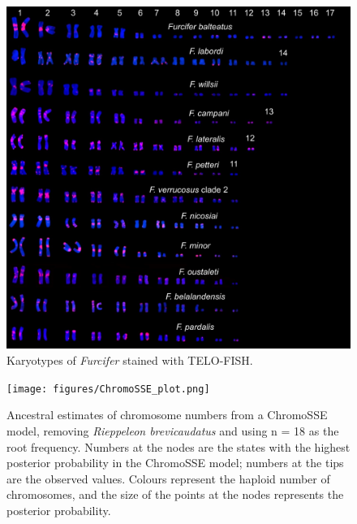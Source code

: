 \documentclass[a4paper, 12pt]{article}
\begin{document}
\newpage
\begin{figure}[h]
 \centering
  \includegraphics[width = \linewidth]{figures/marcello-s6.jpg}
  \caption{Karyotypes of \textit{Furcifer} stained with TELO-FISH.
}
  \label{fig-s6}
\end{figure}

\newpage
\begin{figure}[h]
 \centering
  \texttt{[image: figures/ChromoSSE\_plot.png]}
  \caption{Ancestral estimates of chromosome numbers from a ChromoSSE model, removing \textit{Rieppeleon brevicaudatus} and using n = 18 as the root frequency. Numbers at the nodes are the states with the highest posterior probability in the ChromoSSE model; numbers at the tips are the observed values. Colours represent the haploid number of chromosomes, and the size of the points at the nodes represents the posterior probability.
}
  \label{fig-best}
\end{figure}
\end{document}
